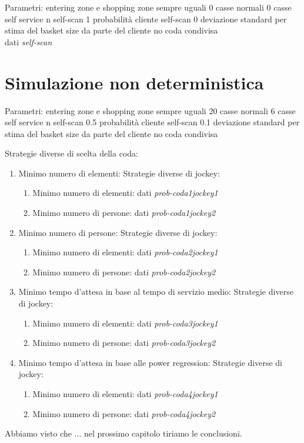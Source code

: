 Parametri:
entering zone e shopping zone sempre uguali
0 casse normali
0 casse self service
n self-scan
1 probabilità cliente self-scan
0 deviazione standard per stima del basket size da parte del cliente
no coda condivisa
\\
dati \textit{self-scan}

\section{Simulazione non deterministica}

Parametri:
entering zone e shopping zone sempre uguali
20 casse normali
6 casse self service
n self-scan
0.5 probabilità cliente self-scan
0.1 deviazione standard per stima del basket size da parte del cliente
no coda condivisa

Strategie diverse di scelta della coda:
\begin{enumerate}
	\item Minimo numero di elementi:
	Strategie diverse di jockey:
	\begin{enumerate}
		\item Minimo numero di elementi: dati \textit{prob-coda1jockey1}
		\item Minimo numero di persone: dati \textit{prob-coda1jockey2}
	\end{enumerate}
	\item Minimo numero di persone:
	Strategie diverse di jockey:
	\begin{enumerate}
		\item Minimo numero di elementi: dati \textit{prob-coda2jockey1}
		\item Minimo numero di persone: dati \textit{prob-coda2jockey2}
	\end{enumerate}
	\item Minimo tempo d'attesa in base al tempo di servizio medio:
	Strategie diverse di jockey:
	\begin{enumerate}
		\item Minimo numero di elementi: dati \textit{prob-coda3jockey1}
		\item Minimo numero di persone: dati \textit{prob-coda3jockey2}
	\end{enumerate}
	\item Minimo tempo d'attesa in base alle power regression: Strategie diverse di jockey:
	\begin{enumerate}
		\item Minimo numero di elementi: dati \textit{prob-coda4jockey1}
		\item Minimo numero di persone: dati \textit{prob-coda4jockey2}
	\end{enumerate}
\end{enumerate}

\vspace*{1\baselineskip}



Abbiamo visto che ... nel prossimo capitolo tiriamo le conclusioni.
